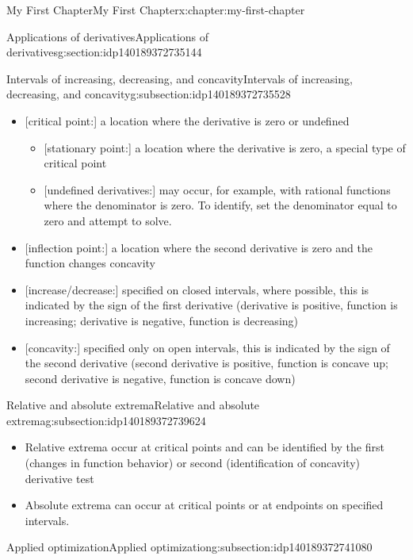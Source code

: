 \documentclass[oneside,10pt,]{book}
\begin{document}
\begin{chapterptx}{My First Chapter}{}{My First Chapter}{}{}{x:chapter:my-first-chapter}
\begin{sectionptx}{Applications of derivatives}{}{Applications of derivatives}{}{}{g:section:idp140189372735144}
\begin{subsectionptx}{Intervals of increasing, decreasing, and concavity}{}{Intervals of increasing, decreasing, and concavity}{}{}{g:subsection:idp140189372735528}
%
\begin{itemize}[label=\textbullet]
\item{}[critical point:] a location where the derivative is zero or undefined%
%
\begin{itemize}[label=$\circ$]
\item{}[stationary point:] a location where the derivative is zero, a special type of critical point%
\item{}[undefined derivatives:] may occur, for example, with rational functions where the denominator is zero. To identify, set the denominator equal to zero and attempt to solve.%
\end{itemize}
\item{}[inflection point:] a location where the second derivative is zero and the function changes concavity%
\item{}[increase\slash{}decrease:] specified on closed intervals, where possible, this is indicated by the sign of the first derivative (derivative is positive, function is increasing; derivative is negative, function is decreasing)%
\item{}[concavity:] specified only on open intervals, this is indicated by the sign of the second derivative (second derivative is positive, function is concave up; second derivative is negative, function is concave down)%
\end{itemize}
\end{subsectionptx}
%
%
\typeout{************************************************}
\typeout{************************************************}
%
\begin{subsectionptx}{Relative and absolute extrema}{}{Relative and absolute extrema}{}{}{g:subsection:idp140189372739624}
%
\begin{itemize}[label=\textbullet]
\item{}Relative extrema occur at critical points and can be identified by the first (changes in function behavior) or second (identification of concavity) derivative test%
\item{}Absolute extrema can occur at critical points or at endpoints on specified intervals.%
\end{itemize}
\end{subsectionptx}
%
%
\typeout{************************************************}
\typeout{************************************************}
%
\begin{subsectionptx}{Applied optimization}{}{Applied optimization}{}{}{g:subsection:idp140189372741080}

\end{subsectionptx}
\end{sectionptx}
\end{chapterptx}
\end{document}
